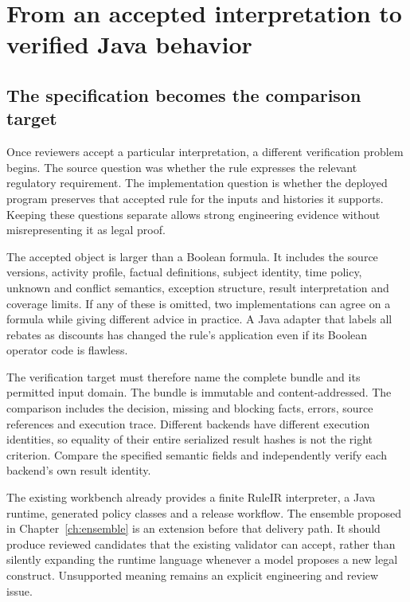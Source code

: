 \chapter{From an accepted interpretation to verified Java behavior}
\label{ch:verification}

\section{The specification becomes the comparison target}

Once reviewers accept a particular interpretation, a different verification
problem begins. The source question was whether the rule expresses the relevant
regulatory requirement. The implementation question is whether the deployed
program preserves that accepted rule for the inputs and histories it supports.
Keeping these questions separate allows strong engineering evidence without
misrepresenting it as legal proof.

The accepted object is larger than a Boolean formula. It includes the source
versions, activity profile, factual definitions, subject identity, time policy,
unknown and conflict semantics, exception structure, result interpretation and
coverage limits. If any of these is omitted, two implementations can agree on a
formula while giving different advice in practice. A Java adapter that labels
all rebates as discounts has changed the rule's application even if its Boolean
operator code is flawless.

The verification target must therefore name the complete bundle and its
permitted input domain. The bundle is immutable and content-addressed. The
comparison includes the decision, missing and blocking facts, errors, source
references and execution trace. Different backends have different execution
identities, so equality of their entire serialized result hashes is not the
right criterion. Compare the specified semantic fields and independently verify
each backend's own result identity.

The existing workbench already provides a finite RuleIR interpreter, a Java
runtime, generated policy classes and a release workflow. The ensemble proposed
in Chapter~\ref{ch:ensemble} is an extension before that delivery path. It should
produce reviewed candidates that the existing validator can accept, rather than
silently expanding the runtime language whenever a model proposes a new legal
construct. Unsupported meaning remains an explicit engineering and review issue.

